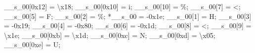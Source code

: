 \documentclass[
]{article}
\newenvironment{Shaded}{}{}
\newcommand{\BaseNTok}[1]{\textcolor[rgb]{0.25,0.63,0.44}{#1}}
\newcommand{\CharTok}[1]{\textcolor[rgb]{0.25,0.44,0.63}{#1}}
\newcommand{\DecValTok}[1]{\textcolor[rgb]{0.25,0.63,0.44}{#1}}
\newcommand{\NormalTok}[1]{#1}
\newcommand{\OperatorTok}[1]{\textcolor[rgb]{0.40,0.40,0.40}{#1}}
\newcommand{\SpecialCharTok}[1]{\textcolor[rgb]{0.25,0.44,0.63}{#1}}
\begin{document}
\begin{Shaded}
\begin{Highlighting}[]
\NormalTok{  \_\_s\_00}\OperatorTok{[}\BaseNTok{0x12}\OperatorTok{]} \OperatorTok{=} \CharTok{\textquotesingle{}}\SpecialCharTok{\textbackslash{}x18}\CharTok{\textquotesingle{}}\OperatorTok{;}
\NormalTok{  \_\_s\_00}\OperatorTok{[}\BaseNTok{0x10}\OperatorTok{]} \OperatorTok{=} \CharTok{\textquotesingle{}i\textquotesingle{}}\OperatorTok{;}
\NormalTok{  \_\_s\_00}\OperatorTok{[}\DecValTok{10}\OperatorTok{]} \OperatorTok{=} \CharTok{\textquotesingle{}\%\textquotesingle{}}\OperatorTok{;}
\NormalTok{  \_\_s\_00}\OperatorTok{[}\DecValTok{7}\OperatorTok{]} \OperatorTok{=} \CharTok{\textquotesingle{}\textless{}\textquotesingle{}}\OperatorTok{;}
\NormalTok{  \_\_s\_00}\OperatorTok{[}\DecValTok{5}\OperatorTok{]} \OperatorTok{=} \CharTok{\textquotesingle{}F\textquotesingle{}}\OperatorTok{;}
\NormalTok{  \_\_s\_00}\OperatorTok{[}\DecValTok{2}\OperatorTok{]} \OperatorTok{=} \CharTok{\textquotesingle{}\%\textquotesingle{}}\OperatorTok{;}
  \OperatorTok{*}\NormalTok{\_\_s\_00 }\OperatorTok{=} \OperatorTok{{-}}\BaseNTok{0x1e}\OperatorTok{;}
\NormalTok{  \_\_s\_00}\OperatorTok{[}\DecValTok{1}\OperatorTok{]} \OperatorTok{=} \CharTok{\textquotesingle{}H\textquotesingle{}}\OperatorTok{;}
\NormalTok{  \_\_s\_00}\OperatorTok{[}\DecValTok{3}\OperatorTok{]} \OperatorTok{=} \OperatorTok{{-}}\BaseNTok{0x19}\OperatorTok{;}
\NormalTok{  \_\_s\_00}\OperatorTok{[}\DecValTok{4}\OperatorTok{]} \OperatorTok{=} \OperatorTok{{-}}\BaseNTok{0x80}\OperatorTok{;}
\NormalTok{  \_\_s\_00}\OperatorTok{[}\DecValTok{6}\OperatorTok{]} \OperatorTok{=} \OperatorTok{{-}}\BaseNTok{0x1d}\OperatorTok{;}
\NormalTok{  \_\_s\_00}\OperatorTok{[}\DecValTok{8}\OperatorTok{]} \OperatorTok{=} \CharTok{\textquotesingle{}\textless{}\textquotesingle{}}\OperatorTok{;}
\NormalTok{  \_\_s\_00}\OperatorTok{[}\DecValTok{9}\OperatorTok{]} \OperatorTok{=} \CharTok{\textquotesingle{}}\SpecialCharTok{\textbackslash{}x1e}\CharTok{\textquotesingle{}}\OperatorTok{;}
\NormalTok{  \_\_s\_00}\OperatorTok{[}\BaseNTok{0xb}\OperatorTok{]} \OperatorTok{=} \CharTok{\textquotesingle{}}\SpecialCharTok{\textbackslash{}x1d}\CharTok{\textquotesingle{}}\OperatorTok{;}
\NormalTok{  \_\_s\_00}\OperatorTok{[}\BaseNTok{0xc}\OperatorTok{]} \OperatorTok{=} \CharTok{\textquotesingle{}N\textquotesingle{}}\OperatorTok{;}
\NormalTok{  \_\_s\_00}\OperatorTok{[}\BaseNTok{0xd}\OperatorTok{]} \OperatorTok{=} \CharTok{\textquotesingle{}}\SpecialCharTok{\textbackslash{}x05}\CharTok{\textquotesingle{}}\OperatorTok{;}
\NormalTok{  \_\_s\_00}\OperatorTok{[}\BaseNTok{0xe}\OperatorTok{]} \OperatorTok{=} \CharTok{\textquotesingle{}U\textquotesingle{}}\OperatorTok{;}

\end{Highlighting}
\end{Shaded}
\end{document}
